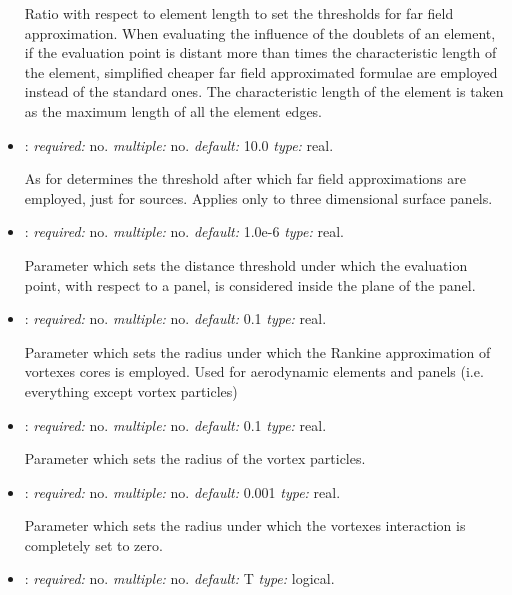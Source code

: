 \begin{itemize}
Ratio with respect to element length to set the thresholds for far field approximation. 
When evaluating the influence of the doublets of an element, 
if the evaluation point is distant more than  
times the characteristic length of the element, simplified cheaper far field 
approximated formulae are employed instead of the standard ones. 
The characteristic length of the element is taken as the maximum 
length of all the element edges.

\item {}: \textit{required:} no. 
\textit{multiple:} no. \textit{default:} 10.0 \textit{type:} real.

As for  determines the threshold 
after which far field approximations are employed, just for sources. 
Applies only to three dimensional surface panels. 

\item {}: \textit{required:} no. \textit{multiple:} no. 
\textit{default:} 1.0e-6 \textit{type:} real.

Parameter which sets the distance threshold under which the evaluation point, 
with respect to a panel, is considered inside the plane of the panel.

\item {}: \textit{required:} no. \textit{multiple:} no. 
\textit{default:} 0.1 \textit{type:} real.

Parameter which sets the radius under which the Rankine approximation of 
vortexes cores is employed. Used for aerodynamic elements and panels 
(i.e. everything except vortex particles)

\item {}: \textit{required:} no. \textit{multiple:} no. 
\textit{default:} 0.1 \textit{type:} real.

Parameter which sets the radius of the vortex particles.

\item {}: \textit{required:} no. \textit{multiple:} no. 
\textit{default:} 0.001 \textit{type:} real. 

Parameter which sets the radius under which the vortexes interaction is completely set to zero.

\item {}: \textit{required:} no. \textit{multiple:} no. 
\textit{default:} T \textit{type:} logical.


\end{itemize}
